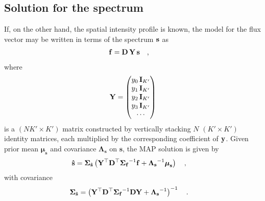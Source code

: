 \documentclass[modern]{aastex631}
\begin{document}
\subsection{Solution for the spectrum}
\label{sec:solve_s}
%
If, on the other hand, the spatial intensity profile is known, the model for the flux vector may be written in terms of the spectrum ${\mathbf{s}}$ as
%
\begin{align}
    \label{eq:inverse:fs}
    {\ensuremath{\mathbf{f}}}
     & =
    {\mathbf{D}}
    \,
    {\mathbf{Y}}
    \,
    {\mathbf{s}}
    \quad,
\end{align}
%
where
%
\begin{align}
    \label{eq:inverse:Y}
    {\ensuremath{\mathbf{Y}}} =
    \begin{pmatrix}
        y_0\, {\mathbf{I}}_{K'} \\
        y_1\, {\mathbf{I}}_{K'} \\
        y_2\, {\mathbf{I}}_{K'} \\
        y_3\, {\mathbf{I}}_{K'} \\
        \cdots
    \end{pmatrix}
\end{align}
%
is a $(NK' \times K')$ matrix constructed by vertically stacking $N$ $(K' \times K')$ identity matrices, each multiplied by the corresponding coefficient of ${\mathbf{y}}$. 
Given prior mean $\boldsymbol{\mu}_\mathbf{s}$ and covariance $\boldsymbol{\Lambda}_\mathbf{s}$ on $\mathbf{s}$, the MAP solution is given by
%
\begin{align}
    \label{eq:inverse:shat}
    {\ensuremath{\mathbf{\hat{s}}}} & =
    \boldsymbol{\Sigma}_\mathbf{\hat{s}}
    \left(
    {\mathbf{Y}}^\top{\ensuremath{\mathbf{D}}}^\top
    {\boldsymbol{\Sigma}_\mathbf{f}}^{-1}
    {\mathbf{f}}
    +
    {\boldsymbol{\Lambda}_\mathbf{s}}^{-1} \boldsymbol{\mu}_\mathbf{s}
    \right)
    \quad,
\end{align}
%
with covariance
%
\begin{align}
    \label{eq:inverse:scov}
    \boldsymbol{\Sigma}_\mathbf{\hat{s}} & =
    \left(
    {\mathbf{Y}}^\top{\ensuremath{\mathbf{D}}}^\top
    {\boldsymbol{\Sigma}_\mathbf{f}}^{-1}
    {\mathbf{D}}{\mathbf{Y}}
    +
    {\boldsymbol{\Lambda}_\mathbf{s}}^{-1}
    \right)^{-1}
    \quad.
\end{align}
\end{document}
